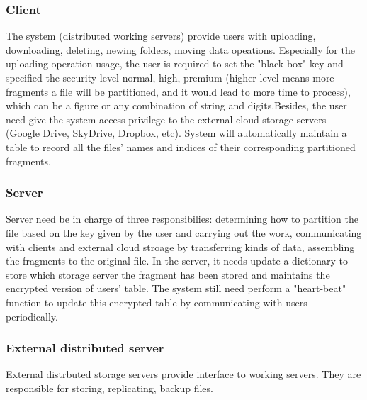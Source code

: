 \subsubsection{Client}
The system (distributed working servers) provide users with uploading, downloading, deleting, newing folders, moving data opeations. Especially for the uploading operation usage, the user is required to set the "black-box" key and specified the security level {normal, high, premium} (higher level means more fragments a file will be partitioned, and it would lead to more time to process), which can be a figure or any combination of string and digits.Besides, the user need give the system access privilege to the external cloud storage servers (Google Drive, SkyDrive, Dropbox, etc). System will automatically maintain a table to record all the files' names and indices of their corresponding partitioned fragments. 

\subsubsection{Server}
Server need be in charge of three responsibilies: determining how to partition the file based on the key given by the user and carrying out the work, communicating with clients and external cloud stroage by transferring kinds of data, assembling the fragments to the original file. In the server, it needs update a dictionary to store which storage server the fragment has been stored and maintains the encrypted version of users' table.
The system still need perform a "heart-beat" function to update this encrypted table by communicating with users periodically.
\subsubsection{External distributed server}
External distrbuted storage servers provide interface to working servers. They are responsible for storing, replicating, backup files.
